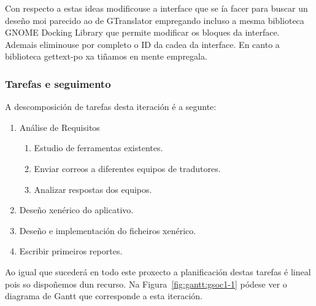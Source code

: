 Con respecto a estas ideas modificouse a interface que se ía facer para buscar un deseño moi parecido ao de GTranslator empregando incluso a mesma biblioteca GNOME Docking Library que permite modificar os bloques da interface. Ademais eliminouse por completo o ID da cadea da interface. En canto a biblioteca gettext-po xa tiñamos en mente empregala.

\subsubsection{Tarefas e seguimento}

A descomposición de tarefas desta iteración é a segunte:

\begin{enumerate}[label=\bfseries WBS 1.\arabic*]
  \item Análise de Requisitos
    \begin{enumerate}[label=\bfseries WBS 1.1.\arabic*]
      \item Estudio de ferramentas existentes.
      \item Enviar correos a diferentes equipos de tradutores.
      \item Analizar respostas dos equipos.
    \end{enumerate}
  \item Deseño xenérico do aplicativo.
  \item Deseño e implementación do ficheiros xenérico.
  \item Escribir primeiros reportes.
\end{enumerate}

Ao igual que sucederá en todo este proxecto a planificación destas tarefas é lineal pois so dispoñemos dun recurso. Na Figura~\ref{fig:gantt:gsoc1-1} pódese ver o diagrama de Gantt que corresponde a esta iteración.

